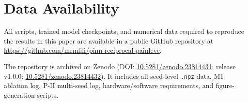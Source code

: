 \documentclass[11pt,a4paper]{article}
\theoremstyle{definition}
\begin{document}
\section*{Data Availability}
\begin{sloppypar}
All scripts, trained model checkpoints, and numerical data required to reproduce the results in this paper are available in a public GitHub repository at \url{https://github.com/mrmlili/pinn-reciprocal-painleve}.

The repository is archived on Zenodo (DOI: \href{https://doi.org/10.5281/zenodo.23814431}{10.5281/zenodo.23814431}; release v1.0.0: \href{https://doi.org/10.5281/zenodo.23814432}{10.5281/zenodo.23814432}). It includes all seed-level \texttt{.npz} data, M1 ablation log, P-II multi-seed log, hardware/software requirements, and figure-generation scripts.
\end{sloppypar}
\end{document}
